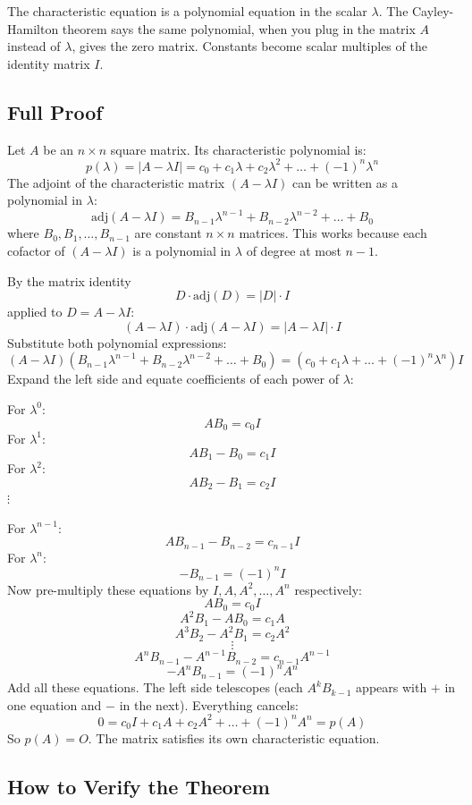 \documentclass[
]{article}
\begin{document}
The characteristic equation is a polynomial equation in the scalar
\(\lambda\). The Cayley-Hamilton theorem says the same polynomial, when
you plug in the matrix \(A\) instead of \(\lambda\), gives the zero
matrix. Constants become scalar multiples of the identity matrix \(I\).

\subsection{Full Proof}\label{full-proof}

Let \(A\) be an \(n \times n\) square matrix. Its characteristic
polynomial is:
\[
p(\lambda) = |A - \lambda I| = c_0 + c_1\lambda + c_2\lambda^2 + \dots + (-1)^n\lambda^n
\]
The adjoint of the characteristic matrix \((A - \lambda I)\) can be
written as a polynomial in \(\lambda\):
\[
\text{adj}(A - \lambda I) = B_{n-1}\lambda^{n-1} + B_{n-2}\lambda^{n-2} + \dots + B_0
\]
where \(B_0, B_1, \dots, B_{n-1}\) are constant \(n \times n\) matrices.
This works because each cofactor of \((A - \lambda I)\) is a polynomial
in \(\lambda\) of degree at most \(n - 1\).

By the matrix identity
\[
D \cdot \text{adj}(D) = \lvert D \rvert \cdot I
\]
applied to \(D = A - \lambda I\):
\[
(A - \lambda I) \cdot \text{adj}(A - \lambda I) = |A - \lambda I| \cdot I
\]
Substitute both polynomial expressions:
\[
(A - \lambda I)(B_{n-1}\lambda^{n-1} + B_{n-2}\lambda^{n-2} + \dots + B_0) = (c_0 + c_1\lambda + \dots + (-1)^n\lambda^n)I
\]
Expand the left side and equate coefficients of each power of
\(\lambda\):

For \(\lambda^0\):
\[
AB_0 = c_0 I
\]
For \(\lambda^1\):
\[
AB_1 - B_0 = c_1 I
\]
For \(\lambda^2\):
\[
AB_2 - B_1 = c_2 I
\]
\(\vdots\)

For \(\lambda^{n-1}\):
\[
AB_{n-1} - B_{n-2} = c_{n-1}I
\]
For \(\lambda^n\):
\[
-B_{n-1} = (-1)^n I
\]
Now pre-multiply these equations by \(I, A, A^2, \dots, A^n\)
respectively:
\[
AB_0 = c_0 I
\]
\[
A^2 B_1 - AB_0 = c_1 A
\]
\[
A^3 B_2 - A^2 B_1 = c_2 A^2
\]
\[
\vdots
\]
\[
A^n B_{n-1} - A^{n-1}B_{n-2} = c_{n-1}A^{n-1}
\]
\[
-A^n B_{n-1} = (-1)^n A^n
\]
Add all these equations. The left side telescopes (each \(A^k B_{k-1}\)
appears with \(+\) in one equation and \(-\) in the next). Everything
cancels:
\[
0 = c_0 I + c_1 A + c_2 A^2 + \dots + (-1)^n A^n = p(A)
\]
So \(p(A) = O\). The matrix satisfies its own characteristic equation.

\subsection{How to Verify the Theorem}\label{how-to-verify-the-theorem}
\end{document}
